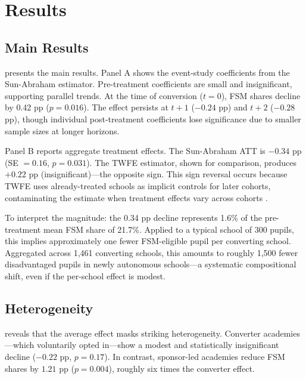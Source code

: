 \documentclass[12pt]{article}
\begin{document}
\section{Results}

\subsection{Main Results}



 presents the main results. Panel A shows the event-study coefficients from the Sun-Abraham estimator. Pre-treatment coefficients are small and insignificant, supporting parallel trends. At the time of conversion ($t = 0$), FSM shares decline by 0.42 pp ($p = 0.016$). The effect persists at $t+1$ ($-0.24$ pp) and $t+2$ ($-0.28$ pp), though individual post-treatment coefficients lose significance due to smaller sample sizes at longer horizons.

Panel B reports aggregate treatment effects. The Sun-Abraham ATT is $-0.34$ pp (SE $= 0.16$, $p = 0.031$). The TWFE estimator, shown for comparison, produces $+0.22$ pp (insignificant)---the opposite sign. This sign reversal occurs because TWFE uses already-treated schools as implicit controls for later cohorts, contaminating the estimate when treatment effects vary across cohorts \citep{goodmanBacon2021}.

To interpret the magnitude: the 0.34 pp decline represents 1.6\% of the pre-treatment mean FSM share of 21.7\%. Applied to a typical school of 300 pupils, this implies approximately one fewer FSM-eligible pupil per converting school. Aggregated across 1,461 converting schools, this amounts to roughly 1,500 fewer disadvantaged pupils in newly autonomous schools---a systematic compositional shift, even if the per-school effect is modest.

\subsection{Heterogeneity}



 reveals that the average effect masks striking heterogeneity. Converter academies---which voluntarily opted in---show a modest and statistically insignificant decline ($-0.22$ pp, $p = 0.17$). In contrast, sponsor-led academies reduce FSM shares by $1.21$ pp ($p = 0.004$), roughly six times the converter effect.
\end{document}

